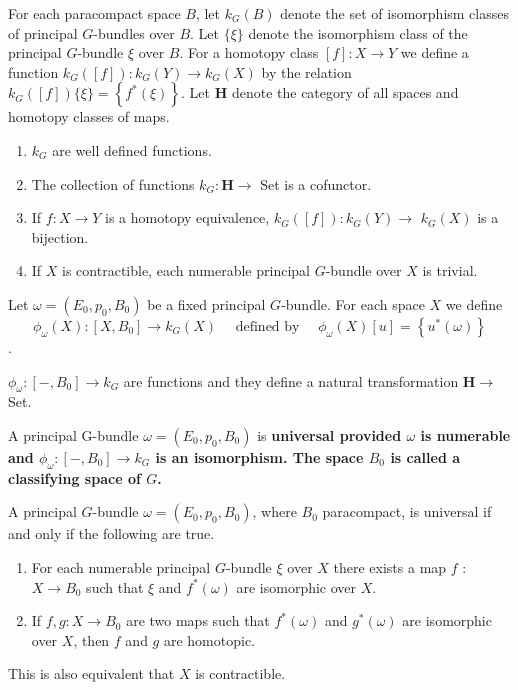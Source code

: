 For each paracompact space $B$, let $k_G(B)$ denote the set of isomorphism classes of principal $G$-bundles over $B$. Let $\{\xi\}$ denote the isomorphism class of the principal $G$-bundle $\xi$ over $B$. For a homotopy class $[f]: X \rightarrow Y$ we define a function $k_G([f]): k_G(Y) \rightarrow k_G(X)$ by the relation $k_G([f])\{\xi\}= \left\{f^*(\xi)\right\}$.
Let $\mathbf{H}$ denote the category of all spaces and homotopy classes of maps.

\begin{theo}
    \begin{enumerate}
        \item $k_G$ are well defined functions.
        \item The collection of functions $k_G: \mathbf{H} \rightarrow$ Set is a cofunctor.
        \item If $f: X \rightarrow Y$ is a homotopy equivalence, $k_G([f]): k_G(Y) \rightarrow$ $k_G(X)$ is a bijection.
        \item If $X$ is contractible, each numerable principal $G$-bundle over $X$ is trivial.
    \end{enumerate}
\end{theo}

Let $\omega=\left(E_0, p_0, B_0\right)$ be a fixed principal $G$-bundle. For each space $X$ we define $$\phi_\omega(X):\left[X, B_0\right] \rightarrow k_G(X) \quad \text{ defined by } \quad \phi_\omega(X)[u]=\left\{u^*(\omega)\right\}$$.

\begin{prop}
    
     $\phi_\omega:\left[-, B_0\right] \rightarrow k_G$ are functions and they define a natural transformation $\mathbf{H} \rightarrow$ Set.
\end{prop}


A principal G-bundle $\omega=\left(E_0, p_0, B_0\right)$ is \bf{universal} provided $\omega$ is numerable and $\phi_\omega:\left[-, B_0\right] \rightarrow k_G$ is an isomorphism. The space $B_0$ is called a \bf{classifying space} of $G$.

\begin{theo}
    A principal $G$-bundle $\omega=\left(E_0, p_0, B_0\right)$, where $B_0$ paracompact, is universal if and only if the following are true.
    \begin{enumerate}
        \item For each numerable principal $G$-bundle $\xi$ over $X$ there exists a map $f$ : $X \rightarrow B_0$ such that $\xi$ and $f^*(\omega)$ are isomorphic over $X$.
        \item If $f, g: X \rightarrow B_0$ are two maps such that $f^*(\omega)$ and $g^*(\omega)$ are isomorphic over $X$, then $f$ and $g$ are homotopic.
    \end{enumerate}
This is also equivalent that $X$ is contractible.
\end{theo}


